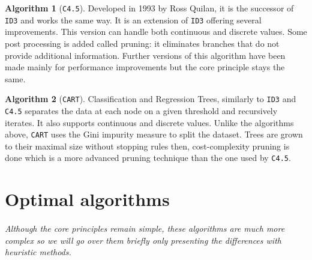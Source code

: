 \documentclass[12pt]{report}
\theoremstyle{definition}
\theoremstyle{definition}
\newtheorem*{algo}{Algorithm}
\theoremstyle{definition}
\begin{document}
\begin{algo}[\texttt{C4.5}]
    Developed in 1993 by Ross Quilan, it is the successor of \texttt{ID3} and works the same way. It is an extension
    of \texttt{ID3} offering several improvements. This version can handle both continuous and discrete values.
    Some post processing is added called pruning: it eliminates branches that do not provide additional
    information. Further versions of this algorithm have been made mainly for performance improvements but
    the core principle stays the same.
\end{algo}

\begin{algo}[\texttt{CART}]
    Classification and Regression Trees, similarly to \texttt{ID3} and \texttt{C4.5} separates the data at each node
    on a given threshold and recursively iterates. It also supports continuous and discrete values. Unlike the algorithms
    above, \texttt{CART} uses the Gini impurity measure to split the dataset. Trees are grown to their maximal size
    without stopping rules then, cost-complexity pruning is done which is a more advanced pruning technique
    than the one used by \texttt{C4.5}.
\end{algo}


\section{Optimal algorithms}
\paragraph{} \textit{Although the core principles remain simple, these algorithms are much more complex so we will go
over them briefly only presenting the differences with heuristic methods.}
\end{document}
